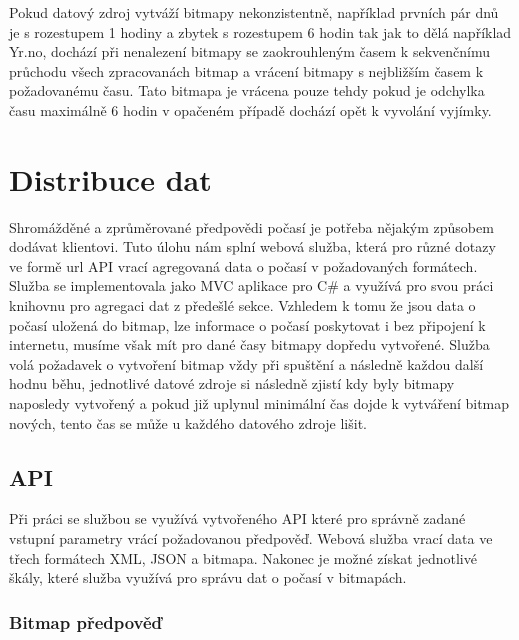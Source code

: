 \documentclass[czech,bachelor,dept460,male,csharp,cpdeclaration]{diploma}
\begin{document}
	Pokud datový zdroj vytváží bitmapy nekonzistentně, například prvních pár dnů je s rozestupem 1 hodiny a zbytek s rozestupem 6 hodin tak jak to dělá například Yr.no, dochází při nenalezení bitmapy se zaokrouhleným časem k sekvenčnímu průchodu všech zpracovanách bitmap a vrácení bitmapy s nejbližším časem k požadovanému času. Tato bitmapa je vrácena pouze tehdy pokud je odchylka času maximálně 6 hodin v opačeném případě dochází opět k vyvolání vyjímky.
	
	\chapter{Distribuce dat}
	
	Shromážděné a zprůměrované předpovědi počasí je potřeba nějakým způsobem dodávat klientovi. Tuto úlohu nám splní webová služba, která pro různé dotazy ve formě url API vrací agregovaná data o počasí v požadovaných formátech. Služba se implementovala jako MVC aplikace pro C\# a využívá pro svou práci knihovnu pro agregaci dat z předešlé sekce. Vzhledem k tomu že jsou data o počasí uložená do bitmap, lze informace o počasí poskytovat i bez připojení k internetu, musíme však mít pro dané časy bitmapy dopředu vytvořené. Služba volá požadavek o vytvoření bitmap vždy při spuštění a následně každou další hodnu běhu, jednotlivé datové zdroje si následně zjistí kdy byly bitmapy naposledy vytvořený a pokud již uplynul minimální čas dojde k vytváření bitmap nových, tento čas se může u každého datového zdroje lišit.
	
	\section{API}
	
	Při práci se službou se využívá vytvořeného API které pro správně zadané vstupní parametry vrácí požadovanou předpověď. Webová služba vrací data ve třech formátech XML, JSON a bitmapa. Nakonec je možné získat jednotlivé škály, které služba využívá pro správu dat o počasí v bitmapách.
	
	\subsection{Bitmap předpověď}
	
\end{document}
